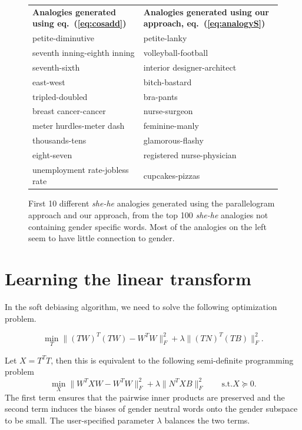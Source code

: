 \documentclass{article}
\begin{document}
\begin{figure}
\begin{tabular}{ll}
   {\bf Analogies generated using eq.~(\ref{eq:cosadd})}	&{\bf Analogies generated using our approach, eq.~(\ref{eq:analogyS})}\\
   petite-diminutive	&petite-lanky	\\
   seventh inning-eighth inning	&volleyball-football	\\
   seventh-sixth	&interior designer-architect	\\
   east-west	&bitch-bastard	\\
   tripled-doubled	&bra-pants	\\
   breast cancer-cancer	&nurse-surgeon	\\
   meter hurdles-meter dash	&feminine-manly	\\
   thousands-tens	&glamorous-flashy	\\
   eight-seven	&registered nurse-physician	\\
   unemployment rate-jobless rate	&cupcakes-pizzas	\\
\end{tabular}
\caption{\label{fig:analogy_comparison}First 10 different {\em she-he} analogies generated using the parallelogram approach and our approach, from the top 100 {\em she-he} analogies not containing gender specific words. Most of the analogies on the left seem to have little connection to gender. }
\end{figure}

\section{Learning the linear transform}\label{sec:transform}
In the soft debiasing algorithm, we need to solve the following optimization problem.

\[
\min_T  \| (TW)^T(TW)-W^T W \|_F^2 + \lambda \|(TN)^T(TB)\|_F^2.
\]

Let $X = T^T T$, then this is equivalent to the following semi-definite programming problem
\begin{equation}
\label{eq:sdp}
\min_X \| W^T X W - W^T W \|_F^2 + \lambda \| N^T X B\|_F^2 \qquad \mbox{s.t.}  X\succeq 0.
\end{equation}
The first term ensures that the pairwise inner products are preserved and the second term induces the biases of gender neutral words onto the gender subspace to be small. The user-specified parameter $\lambda$ balances the two terms. 
\end{document}
